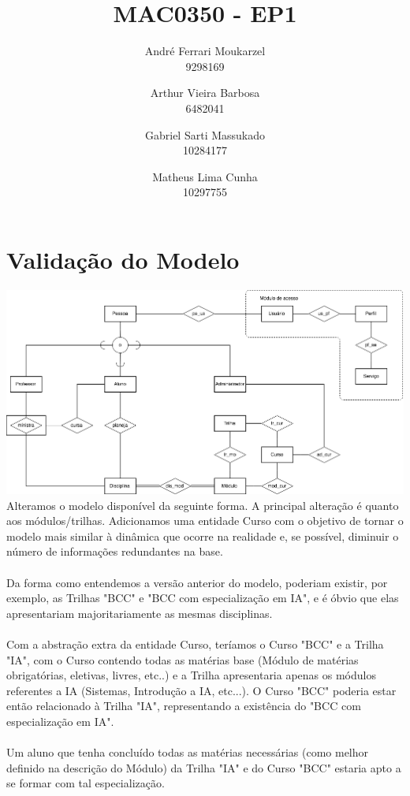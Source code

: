 \documentclass{article}
\title{MAC0350 - EP1}
\date{}
\author{
	André Ferrari Moukarzel \\ 9298169
	\and
	Arthur Vieira Barbosa \\ 6482041
	\and
	Gabriel Sarti Massukado \\ 10284177
	\and
	Matheus Lima Cunha \\ 10297755
}
\begin{document}
  \maketitle
  \newpage
  
  \section{Validação do Modelo}
  
  \includegraphics[width=\textwidth]{NossoModelo.png}\\
  
  Alteramos o modelo disponível da seguinte forma. A principal alteração é quanto aos módulos/trilhas. Adicionamos uma entidade Curso com o objetivo de tornar o modelo mais similar à dinâmica que ocorre na realidade e, se possível, diminuir o número de informações redundantes na base. \\
  \\
  Da forma como entendemos a versão anterior do modelo, poderiam existir, por exemplo, as Trilhas "BCC" e "BCC com especialização em IA", e é óbvio que elas apresentariam majoritariamente as mesmas disciplinas. \\
  \\
  Com a abstração extra da entidade Curso, teríamos o Curso "BCC" e a Trilha "IA", com o Curso contendo todas as matérias base (Módulo de matérias obrigatórias, eletivas, livres, etc..) e a Trilha apresentaria apenas os módulos referentes a IA (Sistemas, Introdução a IA, etc...). O Curso "BCC" poderia estar então relacionado à Trilha "IA", representando a existência do "BCC com especialização em IA". \\
  \\
  Um aluno que tenha concluído todas as matérias necessárias (como melhor definido na descrição do Módulo) da Trilha "IA" e do Curso "BCC" estaria apto a se formar com tal especialização.
  
\end{document}
